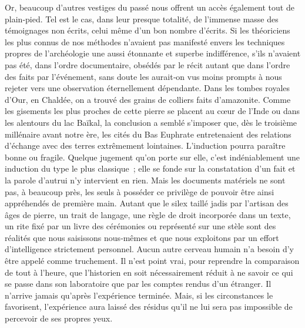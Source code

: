 \documentclass[french,twoside]{book} %
\newcommand{\astermono}{\medskip\centerline{\color{rubric}\large\selectfont{\syms ✻}}\medskip\par}%
\begin{document}
Or, beaucoup d’autres vestiges du passé nous offrent un accès également tout de plain‑pied. Tel est le cas, dans leur presque totalité, de l’immense masse des témoignages non écrits, celui même d’un bon nombre d’écrits. Si les théoriciens les plus connus de nos méthodes n’avaient pas manifesté envers les techniques propres de l’archéologie une aussi étonnante et superbe indifférence, s’ils n’avaient pas été, dans l’ordre documentaire, obsédés par le récit autant que dans l’ordre des faits par l’événement, sans doute les aurait‑on vus moins prompts à nous rejeter vers une obser­vation éternellement dépendante. Dans les tombes royales d’Our, en Chaldée, on a trouvé des grains de colliers faits d’amazonite. Comme les gisements les plus proches de cette pierre se placent au cœur de l’Inde ou dans les alentours du lac Baïkal, la conclusion a semblé s’imposer que, dès le troisième millénaire avant notre ère, les cités du Bas Euphrate entretenaient des relations d’échange avec des terres extrêmement loin­taines. L’induction pourra paraître bonne ou fragile. Quelque jugement qu’on porte sur elle, c’est indéniablement une induction du type le plus classique ; elle se fonde sur la constatation d’un fait et la parole d’autrui n’y intervient en rien. Mais les documents matériels ne sont pas, à beau­coup près, les seuls à posséder ce privilège de pouvoir être ainsi appréhendés de première main. Autant que le silex taillé jadis par l’artisan des âges de pierre, un trait de langage, une règle de droit incorporée dans un texte, un rite fixé par un livre des cérémonies ou représenté sur une stèle sont des réalités que nous saisissons nous‑mêmes et que nous exploitons par un effort d’intelligence strictement personnel. Aucun autre cerveau humain n’a besoin d’y être appelé comme truchement. Il n’est point vrai, pour reprendre la comparaison de tout à l’heure, que l’historien en soit néces­sairement réduit à ne savoir ce qui se passe dans son laboratoire que par les comptes rendus d’un étranger. Il n’arrive jamais qu’après l’expérience terminée. Mais, si les circonstances le favorisent, l’expérience aura laissé des résidus qu’il ne lui sera pas impossible de percevoir de ses propres yeux.\par

\astermono
\end{document}
